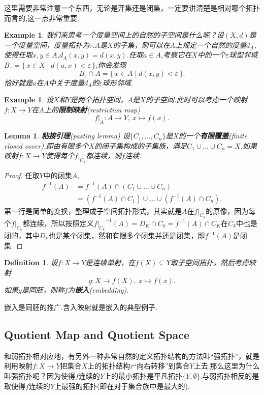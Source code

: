 \documentclass{article}
\newtheorem{lemma}[theorem]{Lemma}
\newtheorem{example}[theorem]{Example}
\newtheorem{definition}[theorem]{Definition}
\newcommand*{\xfunc}[4]{{#2}\colon{#3}{#1}{#4}}
\newcommand*{\func}[3]{\xfunc{\to}{#1}{#2}{#3}}
\newcommand\Set[2]{\{\,#1\mid#2\,\}} %
\begin{document}
这里需要非常注意一个东西，无论是开集还是闭集，一定要讲清楚是相对哪个拓扑而言的,这一点非常重要.

\begin{example}
我们来思考一个度量空间上的自然的子空间是什么呢？设$(X,d)$是一个度量空间，度量拓扑为$\tau$.$A$是$X$的子集，则可以在$A$上规定一个自然的度量$d_A$,使得任取$x,y \in A$,$d_A(x,y)=d(x,y)$.任取$a \in A$,考察它在$X$中的一个$\varepsilon$球型邻域$B_\varepsilon=\Set{x \in X}{d(a,x) < \varepsilon}$,你会发现\[B_\varepsilon \cap A = \Set{x \in A}{d(x,y) < \varepsilon}.\]恰好就是$a$在$A$中关于度量$d_A$的$\varepsilon$球形邻域.	
\end{example}


\begin{example}
设$X$和$Y$是两个拓扑空间，$A$是$X$的子空间.此时可以考虑一个映射$\func{f}{X}{Y}$在$A$上的\textbf{限制映射}(restriction map)\[\func{f|_A}{A}{Y},\ x \mapsto f(x).\]
\end{example}

\begin{lemma}
\textbf{粘接引理}(pasting lemma) 设$\{C_1,\ldots,C_n\}$是$X$的一个\textbf{有限覆盖}(finite closed cover),即由有限多个$X$的闭子集构成的子集族，满足$C_1 \cup \ldots \cup C_n=X$.如果映射$\func{f}{X}{Y}$使得每个$f|_{C_k}$都连续，则$f$连续.
\end{lemma}

\begin{proof}
任取$Y$中的闭集$A$,\[\begin{aligned} 
					f^{-1}(A)&=f^{-1}(A) \cap (C_1 \cup \ldots \cup C_n)\\
					&=(f^{-1}(A) \cap C_1) \cup \ldots \cup (f^{-1}(A) \cap C_n).\end{aligned}\]第一行是简单的变换，整理成子空间拓扑形式，其实就是$A$在$f|_{C_k}$的原像，因为每个$f|_{C_k}$都连续，所以按照定义${f|_{C_k}}^{-1}(A)=D_K \cap C_k = f^{-1}({A}) \cap C_K $在$C_k$中也是闭的，其中$D_k$也是某个闭集，然和有限多个闭集并还是闭集，即$f^{-1}(A)$是闭集.
\end{proof}

\begin{definition}
设$\func{f}{X}{Y}$是连续单射，在$f(X) \subseteq Y$取子空间拓扑，然后考虑映射\[\func{g}{X}{f(X)},\ x \mapsto f(x).\]如果$g$是同胚，则称$f$为\textbf{嵌入}(embedding).
\end{definition}

嵌入是同胚的推广.含入映射就是嵌入的典型例子.


\newpage
\subsection{Quotient Map and Quotient Space}
和弱拓扑相对应地，有另外一种非常自然的定义拓扑结构的方法叫“强拓扑”，就是利用映射$\func{f}{X}{Y}$把集合$X$上的拓扑结构$\tau$“向右转移”到集合$Y$上去.那么这里为什么叫强拓扑呢？因为使得$f$连续的$Y$上的最小拓扑是平凡拓扑$\{Y,\emptyset\}$.与弱拓扑相反的是取使得$f$连续的$Y$上最强的拓扑(即在对于集合族中是最大的).
\end{document}
